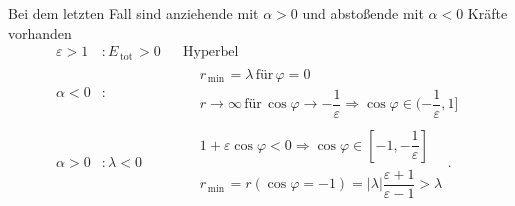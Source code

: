 \documentclass[a4paper,12pt]{article}
\numberwithin{equation}{section}
\begin{document}
Bei dem letzten Fall sind anziehende mit $\alpha >0$ und abstoßende mit $\alpha <0$ Kräfte vorhanden
\begin{align*}
        \varepsilon >1&:E_{\,\text{tot}\,}>0&&\text{Hyperbel}\,\\
        \alpha <0&:&&\begin{aligned}
        &r_{\,\text{min}\,}=\lambda \,\text{für}\,\varphi =0\\
        &r\rightarrow \infty\,\text{für}\,\cos \varphi \rightarrow -\dfrac{1}{\varepsilon }\Rightarrow \cos \varphi  \in (-\dfrac{1}{\varepsilon },1]
        \end{aligned}\\
                \alpha >0&:\lambda <0&&\begin{aligned}
                        &1+\varepsilon \cos \varphi <0\Rightarrow \cos \varphi  \in [-1,-\dfrac{1}{\varepsilon }]\\
                        &r_{\,\text{min}\,}=r\left(\cos \varphi =-1\right)=|\lambda |\dfrac{\varepsilon +1}{\varepsilon -1}>\lambda 
                \end{aligned}
.\end{align*}
\end{document}
